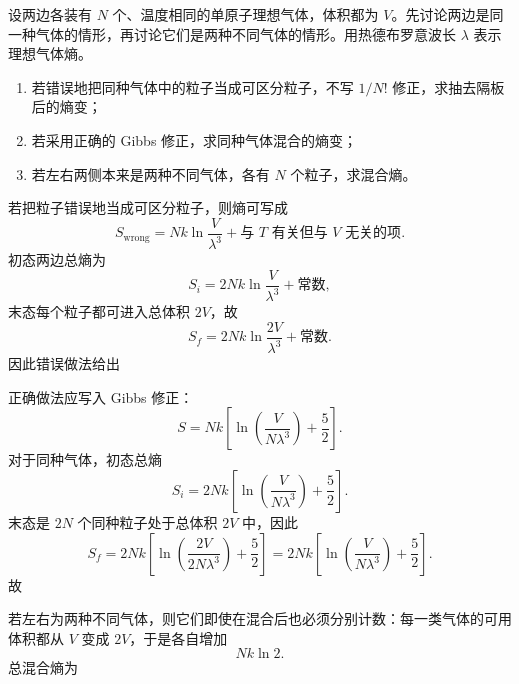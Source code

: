 \begin{question}[18分]
设两边各装有 $N$ 个、温度相同的单原子理想气体，体积都为 $V$。先讨论两边是同一种气体的情形，再讨论它们是两种不同气体的情形。用热德布罗意波长 $\lambda$ 表示理想气体熵。
\begin{enumerate}[label=(\arabic*),leftmargin=2.8em,itemsep=0.2em]
\item 若错误地把同种气体中的粒子当成可区分粒子，不写 $1/N!$ 修正，求抽去隔板后的熵变；
\item 若采用正确的 Gibbs 修正，求同种气体混合的熵变；
\item 若左右两侧本来是两种不同气体，各有 $N$ 个粒子，求混合熵。
\end{enumerate}
\begin{solution}

若把粒子错误地当成可区分粒子，则熵可写成
\[
S_{\mathrm{wrong}}=Nk\ln\frac{V}{\lambda^3}+\text{与 }T\text{ 有关但与 }V\text{ 无关的项}.
\]
初态两边总熵为
\[
S_i=2Nk\ln\frac{V}{\lambda^3}+\text{常数},
\]
末态每个粒子都可进入总体积 $2V$，故
\[
S_f=2Nk\ln\frac{2V}{\lambda^3}+\text{常数}.
\]
因此错误做法给出

正确做法应写入 Gibbs 修正：
\[
S=Nk\left[\ln\!\left(\frac{V}{N\lambda^3}\right)+\frac52\right].
\]
对于同种气体，初态总熵
\[
S_i=2Nk\left[\ln\!\left(\frac{V}{N\lambda^3}\right)+\frac52\right].
\]
末态是 $2N$ 个同种粒子处于总体积 $2V$ 中，因此
\[
S_f=2Nk\left[\ln\!\left(\frac{2V}{2N\lambda^3}\right)+\frac52\right]
=2Nk\left[\ln\!\left(\frac{V}{N\lambda^3}\right)+\frac52\right].
\]
故

若左右为两种不同气体，则它们即使在混合后也必须分别计数：每一类气体的可用体积都从 $V$ 变成 $2V$，于是各自增加
\[
Nk\ln 2.
\]
总混合熵为
\end{solution}
\end{question}

